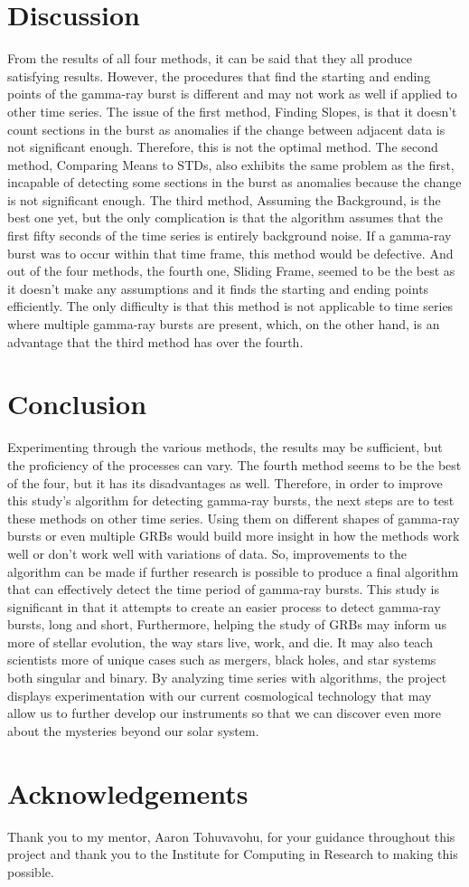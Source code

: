 \documentclass[final,5p,times,twocolumn,authoryear]{elsarticle}
\begin{document}
\section{Discussion}
From the results of all four methods, it can be said that they all produce satisfying results. However, the procedures that find the starting and ending points of the gamma-ray burst is different and may not work as well if applied to other time series. The issue of the first method, Finding Slopes, is that it doesn't count sections in the burst as anomalies if the change between adjacent data is not significant enough. Therefore, this is not the optimal method. The second method, Comparing Means to STDs, also exhibits the same problem as the first, incapable of detecting some sections in the burst as anomalies because the change is not significant enough. The third method, Assuming the Background, is the best one yet, but the only complication is that the algorithm assumes that the first fifty seconds of the time series is entirely background noise. If a gamma-ray burst was to occur within that time frame, this method would be defective. And out of the four methods, the fourth one, Sliding Frame, seemed to be the best as it doesn't make any assumptions and it finds the starting and ending points efficiently. The only difficulty is that this method is not applicable to time series where multiple gamma-ray bursts are present, which, on the other hand, is an advantage that the third method has over the fourth.

\section{Conclusion}
Experimenting through the various methods, the results may be sufficient, but the proficiency of the processes can vary. The fourth method seems to be the best of the four, but it has its disadvantages as well. Therefore, in order to improve this study's algorithm for detecting gamma-ray bursts, the next steps are to test these methods on other time series. Using them on different shapes of gamma-ray bursts  or even multiple GRBs would build more insight in how the methods work well or don't work well with variations of data. So, improvements to the algorithm can be made if further research is possible to produce a final algorithm that can effectively detect the time period of gamma-ray bursts. This study is significant in that it attempts to create an easier process to detect gamma-ray bursts, long and short, Furthermore, helping the study of GRBs may inform us more of stellar evolution, the way stars live, work, and die. It may also teach scientists more of unique cases such as mergers, black holes, and star systems both singular and binary. By analyzing time series with algorithms, the project displays experimentation with our current cosmological technology that may allow us to further develop our instruments so that we can discover even more about the mysteries beyond our solar system.


\section*{Acknowledgements}
Thank you to my mentor, Aaron Tohuvavohu, for your guidance throughout this project and thank you to the Institute for Computing in Research to making this possible.


 

\end{document}
